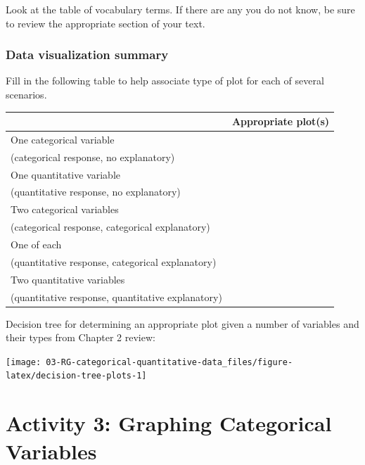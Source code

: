 \documentclass[
]{report}
\newcommand{\rgs}{\vspace{12pt}} %
\begin{document}
Look at the table of vocabulary terms. If there are any you do not know, be sure to review the appropriate section of your text.

\hypertarget{data-visualization-summary}{%
\subsubsection*{Data visualization summary}\label{data-visualization-summary}}

Fill in the following table to help associate type of plot for each of several scenarios.

\begin{center}
\begin{tabular}{|l|p{3in}|} \hline
 & Appropriate plot(s) \\ \hline
One categorical variable & \\
(categorical response, no explanatory) & \\ \hline
One quantitative variable  & \\
(quantitative response, no explanatory) & \\ \hline
Two categorical variables  & \\
(categorical response, categorical explanatory) & \\ \hline
One of each  & \\
(quantitative response, categorical explanatory) & \\ \hline
Two quantitative variables  & \\
(quantitative response, quantitative explanatory) & \\ \hline
\end{tabular}
\end{center}

\rgs
\newpage

Decision tree for determining an appropriate plot given a number of variables and their types from Chapter 2 review:

\begin{center}\texttt{[image: 03-RG-categorical-quantitative-data\_files/figure-latex/decision-tree-plots-1]} \end{center}

\newpage

\hypertarget{activity-3-graphing-categorical-variables}{%
\section{Activity 3: Graphing Categorical Variables}\label{activity-3-graphing-categorical-variables}}
\end{document}
